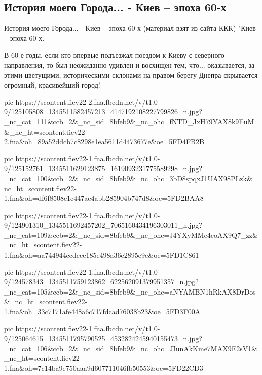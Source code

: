  
 
 

\subsection{История моего Города... - Киев – эпоха 60-х}


История моего Города... - Киев – эпоха 60-х
(материал взят из сайта ККК)
"Киев – эпоха 60-х.

В 60-е годы, если кто впервые подъезжал поездом к Киеву с северного
направления, то был неожиданно удивлен и восхищен тем, что... оказывается, за
этими цветущими, историческими склонами на правом берегу Днепра скрывается
огромный, красивейший город!

\ifcmt
pic https://scontent.fiev22-2.fna.fbcdn.net/v/t1.0-9/125105808_1345511582457213_4147192108227799826_n.jpg?_nc_cat=111&ccb=2&_nc_sid=8bfeb9&_nc_ohc=fNTD_JxH79YAX8k9EuM&_nc_ht=scontent.fiev22-2.fna&oh=89a52ddcb7c8298e1ea5611d4473677e&oe=5FD4FB2B

pic https://scontent.fiev22-1.fna.fbcdn.net/v/t1.0-9/125152761_1345511629123875_1619093231775589298_n.jpg?_nc_cat=100&ccb=2&_nc_sid=8bfeb9&_nc_ohc=3bD8spqxJ1UAX98PLzk&_nc_ht=scontent.fiev22-1.fna&oh=df6f8508e1c447ac4abb285904b747d8&oe=5FD2BAA8

pic https://scontent.fiev22-1.fna.fbcdn.net/v/t1.0-9/124901310_1345511692457202_7065160434196303011_n.jpg?_nc_cat=109&ccb=2&_nc_sid=8bfeb9&_nc_ohc=J4YXyMMe4coAX9Q7_zz&_nc_ht=scontent.fiev22-1.fna&oh=aa744944ccdece185e498a36e2895e9e&oe=5FD1C861

pic https://scontent.fiev22-1.fna.fbcdn.net/v/t1.0-9/124578343_1345511759123862_622562091379951357_n.jpg?_nc_cat=105&ccb=2&_nc_sid=8bfeb9&_nc_ohc=aNYAMBN1hRkAX8DrDos&_nc_ht=scontent.fiev22-1.fna&oh=33c7171afe448a6c717fdcad76038b23&oe=5FD3F00A

pic https://scontent.fiev22-1.fna.fbcdn.net/v/t1.0-9/125064615_1345511795790525_4532824245940155473_n.jpg?_nc_cat=106&ccb=2&_nc_sid=8bfeb9&_nc_ohc=JIunAkKme7MAX9E2sV1&_nc_ht=scontent.fiev22-1.fna&oh=7c14ba9e750aaa9d607711046fb50553&oe=5FD22CD3

